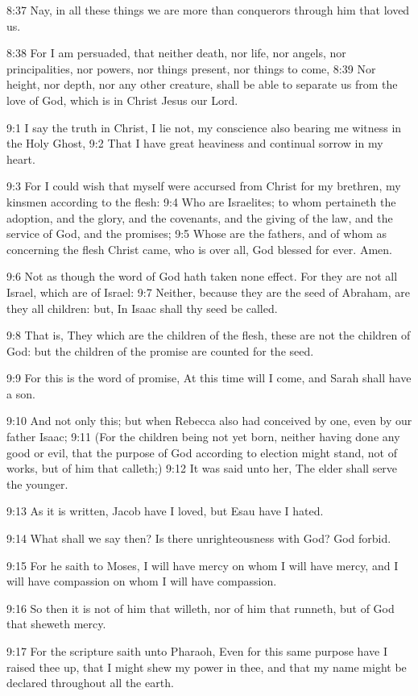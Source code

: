 8:37 Nay, in all these things we are more than conquerors through him that loved us.

8:38 For I am persuaded, that neither death, nor life, nor angels, nor principalities, nor powers, nor things present, nor things to come, 8:39 Nor height, nor depth, nor any other creature, shall be able to separate us from the love of God, which is in Christ Jesus our Lord.

9:1 I say the truth in Christ, I lie not, my conscience also bearing me witness in the Holy Ghost, 9:2 That I have great heaviness and continual sorrow in my heart.

9:3 For I could wish that myself were accursed from Christ for my brethren, my kinsmen according to the flesh: 9:4 Who are Israelites; to whom pertaineth the adoption, and the glory, and the covenants, and the giving of the law, and the service of God, and the promises; 9:5 Whose are the fathers, and of whom as concerning the flesh Christ came, who is over all, God blessed for ever. Amen.

9:6 Not as though the word of God hath taken none effect. For they are not all Israel, which are of Israel: 9:7 Neither, because they are the seed of Abraham, are they all children: but, In Isaac shall thy seed be called.

9:8 That is, They which are the children of the flesh, these are not the children of God: but the children of the promise are counted for the seed.

9:9 For this is the word of promise, At this time will I come, and Sarah shall have a son.

9:10 And not only this; but when Rebecca also had conceived by one, even by our father Isaac; 9:11 (For the children being not yet born, neither having done any good or evil, that the purpose of God according to election might stand, not of works, but of him that calleth;) 9:12 It was said unto her, The elder shall serve the younger.

9:13 As it is written, Jacob have I loved, but Esau have I hated.

9:14 What shall we say then? Is there unrighteousness with God? God forbid.

9:15 For he saith to Moses, I will have mercy on whom I will have mercy, and I will have compassion on whom I will have compassion.

9:16 So then it is not of him that willeth, nor of him that runneth, but of God that sheweth mercy.

9:17 For the scripture saith unto Pharaoh, Even for this same purpose have I raised thee up, that I might shew my power in thee, and that my name might be declared throughout all the earth.

